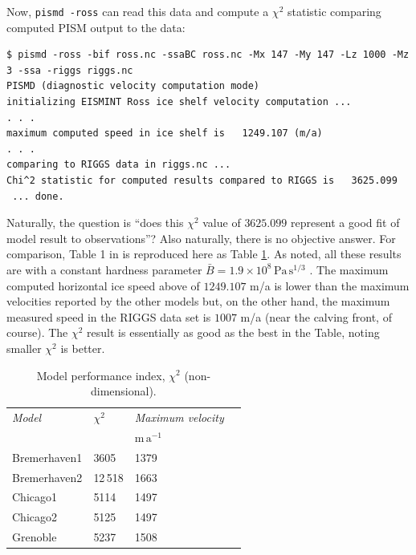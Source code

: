 \documentclass[11pt,final]{amsart}
\begin{document}
Now, \verb|pismd -ross| can read this data and compute a $\chi^2$ statistic comparing computed PISM output to the data:

\small\begin{verbatim}
$ pismd -ross -bif ross.nc -ssaBC ross.nc -Mx 147 -My 147 -Lz 1000 -Mz 3 -ssa -riggs riggs.nc
PISMD (diagnostic velocity computation mode)
initializing EISMINT Ross ice shelf velocity computation ...
. . .
maximum computed speed in ice shelf is   1249.107 (m/a)
. . .
comparing to RIGGS data in riggs.nc ...
Chi^2 statistic for computed results compared to RIGGS is   3625.099
 ... done.
\end{verbatim}
\normalsize

Naturally, the question is ``does this $\chi^2$ value of $3625.099$ represent a good fit of model result to observations''?  Also naturally, there is no objective answer.  For comparison, Table 1 in \cite{MacAyealetal} is reproduced here as Table \ref{tab:chisqr}.  As noted, all these results are with a constant hardness parameter $\bar B = 1.9 \times 10^8 \, \text{Pa}\, \text{s}^{1/3}$ \cite{MacAyealetal}.  The maximum computed horizontal ice speed above of $1249.107$ m/a is lower than the maximum velocities reported by the other models but, on the other hand, the maximum measured speed in the RIGGS data set is $1007$ m/a (near the calving front, of course).  The $\chi^2$ result is essentially as good as the best in the Table, noting smaller $\chi^2$ is better.

\small
\begin{table}[ht]
\caption{Model performance index, $\chi^2$ (non-dimensional).  }\label{tab:chisqr}
\begin{tabular}{@{}llll}\hline
\textsl{Model} & $\chi^2$ & \textsl{Maximum velocity} \\
 & & $\text{m}\,\text{a}^{-1}$ \\ \hline
Bremerhaven1 & 3605 & 1379 \\
Bremerhaven2 & 12\,518 & 1663 \\
Chicago1 & 5114 & 1497 \\
Chicago2 & 5125 & 1497 \\
Grenoble & 5237 & 1508 \\
\hline
\end{tabular}
\end{table}
\normalsize
\end{document}
